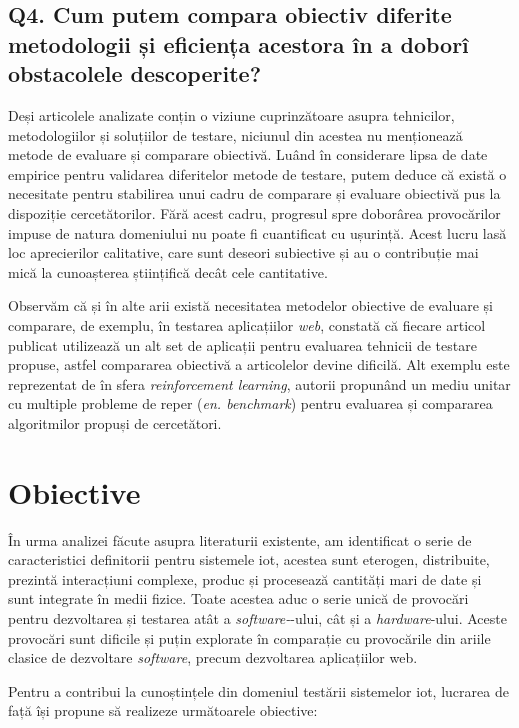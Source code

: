 \subsection*{Q4. Cum putem compara obiectiv diferite metodologii și eficiența acestora în a doborî obstacolele descoperite?}

Deși articolele analizate conțin o viziune cuprinzătoare asupra tehnicilor, metodologiilor și soluțiilor de testare, niciunul din acestea nu menționează metode de evaluare și comparare obiectivă. Luând în considerare lipsa de date empirice pentru validarea diferitelor metode de testare, putem deduce că există o necesitate pentru stabilirea unui cadru de comparare și evaluare obiectivă pus la dispoziție cercetătorilor. Fără acest cadru, progresul spre doborârea provocărilor impuse de natura domeniului nu poate fi cuantificat cu ușurință. Acest lucru lasă loc aprecierilor calitative, care sunt deseori subiective și au o contribuție mai mică la cunoașterea științifică decât cele cantitative.

Observăm că și în alte arii există necesitatea metodelor obiective de evaluare și comparare, de exemplu, în testarea aplicațiilor \textit{web}, \citet{Garousi2013} constată că fiecare articol publicat utilizează un alt set de aplicații pentru evaluarea tehnicii de testare propuse, astfel compararea obiectivă a articolelor devine dificilă. Alt exemplu este reprezentat de \citet{Brockman2016} în sfera \textit{reinforcement learning}, autorii propunând un mediu unitar cu multiple probleme de reper (\textit{en. benchmark}) pentru evaluarea și compararea algoritmilor propuși de cercetători.

\section{Obiective}

În urma analizei făcute asupra literaturii existente, am identificat o serie de caracteristici definitorii pentru sistemele \acrlong{iot}, acestea sunt eterogen, distribuite, prezintă interacțiuni complexe, produc și procesează cantități mari de date și sunt integrate în medii fizice. Toate acestea aduc o serie unică de provocări pentru dezvoltarea și testarea atât a \textit{software-}-ului, cât și a \textit{hardware}-ului. Aceste provocări sunt dificile și puțin explorate în comparație cu provocările din ariile clasice de dezvoltare \textit{software}, precum dezvoltarea aplicațiilor web. 

Pentru a contribui la cunoștințele din domeniul testării sistemelor \acrshort{iot}, lucrarea de față își propune să realizeze următoarele obiective:

